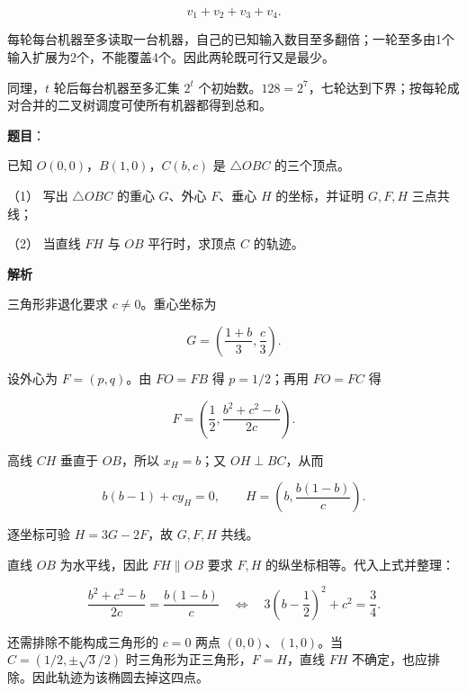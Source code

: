 \begin{answer}
\nopagebreak[4]
\[v_1+v_2+v_3+v_4.\]

每轮每台机器至多读取一台机器，自己的已知输入数目至多翻倍；一轮至多由1个输入扩展为2个，不能覆盖4个。因此两轮既可行又是最少。


同理，$t$ 轮后每台机器至多汇集 $2^t$ 个初始数。$128=2^7$，七轮达到下界；按每轮成对合并的二叉树调度可使所有机器都得到总和。



\end{answer}
\begin{answer}

\textbf{题目}：

已知 \(O(0,0)\)，\(B(1,0)\)，\(C(b,c)\) 是 \(\triangle OBC\) 的三个顶点。

（1） 写出 \(\triangle OBC\) 的重心 \(G\)、外心 \(F\)、垂心 \(H\) 的坐标，并证明 \(G,F,H\) 三点共线；

（2） 当直线 \(FH\) 与 \(OB\) 平行时，求顶点 \(C\) 的轨迹。

\textbf{解析}


三角形非退化要求 $c\ne0$。重心坐标为

\nopagebreak[4]
\[G=\left(\frac{1+b}{3},\frac c3\right).\]

设外心为 $F=(p,q)$。由 $FO=FB$ 得 $p=1/2$；再用 $FO=FC$ 得

\nopagebreak[4]
\[F=\left(\frac12,\frac{b^2+c^2-b}{2c}\right).\]

高线 $CH$ 垂直于 $OB$，所以 $x_H=b$；又 $OH\perp BC$，从而

\nopagebreak[4]
\[b(b-1)+c y_H=0,
\qquad H=\left(b,\frac{b(1-b)}c\right).\]

逐坐标可验 $H=3G-2F$，故 $G,F,H$ 共线。


直线 $OB$ 为水平线，因此 $FH\parallel OB$ 要求 $F,H$ 的纵坐标相等。代入上式并整理：

\nopagebreak[4]
\[\frac{b^2+c^2-b}{2c}=\frac{b(1-b)}c
\quad\Longleftrightarrow\quad 3\left(b-\frac12\right)^2+c^2=\frac34.\]

还需排除不能构成三角形的 $c=0$ 两点 $(0,0)$、$(1,0)$。当 $C=(1/2,\pm\sqrt3/2)$ 时三角形为正三角形，$F=H$，直线 $FH$ 不确定，也应排除。因此轨迹为该椭圆去掉这四点。



\end{answer}

